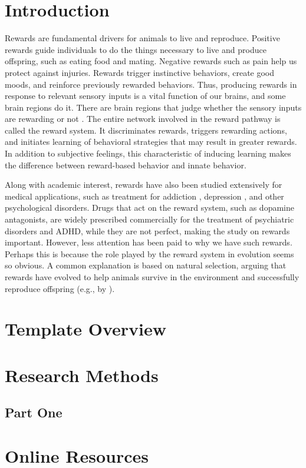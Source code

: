 \documentclass[sigconf]{acmart}
\begin{document}
\section{Introduction}

Rewards are fundamental drivers for animals to live and reproduce. Positive rewards guide individuals to do the things necessary to live and produce offspring, such as eating food and mating. Negative rewards such as pain help us protect against injuries. Rewards trigger instinctive behaviors, create good moods, and reinforce previously rewarded behaviors. Thus, producing rewards in response to relevant sensory inputs is a vital function of our brains, and some brain regions do it. There are brain regions that judge whether the sensory inputs are rewarding or not \cite{schultzNeuronalRewardDecision2015}. The entire network involved in the reward pathway is called the reward system.
It discriminates rewards, triggers rewarding actions, and initiates learning of behavioral strategies that may result in greater rewards. In addition to subjective feelings, this characteristic of inducing learning makes the difference between reward-based behavior and innate behavior.

Along with academic interest, rewards have also been studied extensively for medical applications, such as treatment for  addiction \cite{koobNeuroscienceAddiction1998,solinasDopamineAddictionWhat2019}, depression \cite{dunlopRoleDopaminePathophysiology2007}, and other psychological disorders.
Drugs that act on the reward system, such as dopamine antagonists, are widely prescribed commercially for the treatment of psychiatric disorders and ADHD, while they are not perfect, making the study on rewards important. However, less attention has been paid to why we have such rewards. Perhaps this is because the role played by the reward system in evolution seems so obvious. A common explanation is based on natural selection, arguing that rewards have evolved to help animals survive in the environment and successfully reproduce offspring (e.g., by \cite{schultzNeuronalRewardDecision2015}).

\section{Template Overview}




\appendix

\section{Research Methods}

\subsection{Part One}

\section{Online Resources}
\end{document}
